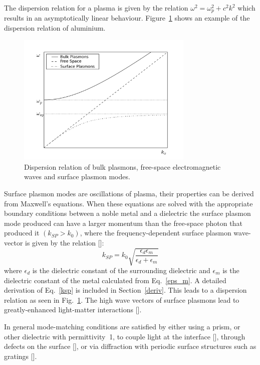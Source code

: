 The dispersion relation for a plasma is given by the relation $\omega^2 = \omega_p^2+c^2k^2$ which results in an asymptotically linear behaviour. Figure~\ref{dispRelation} shows an example of the dispersion relation of aluminium.
\begin{figure}[h!t]
\centering
\includegraphics[width=0.75\textwidth]{plasmon_dispersion.png}
\caption{Dispersion relation of bulk plasmons, free-space electromagnetic waves and surface plasmon modes.}
\label{dispRelation}
\end{figure}

Surface plasmon modes are oscillations of plasma, their properties can be derived from Maxwell's equations. When these equations are solved with the appropriate boundary conditions between a noble metal and a dielectric the surface plasmon mode produced can have a larger momentum than the free-space photon that produced it $(k_{SP}>k_0)$, where the frequency-dependent surface plasmon wave-vector is given by the relation [\cite{Sambles}]:
\begin{equation}
k_{SP} = k_0\sqrt{\frac{\epsilon_d\epsilon_m}{\epsilon_d+\epsilon_m}}
\label{ksp}
\end{equation}
where $\epsilon_d$ is the dielectric constant of the surrounding dielectric and $\epsilon_m$ is the dielectric constant of the metal calculated from Eq.~\ref{eps_m}. A detailed derivation of Eq.~\ref{ksp} is included in Section~\ref{deriv}. This leads to a dispersion relation as seen in Fig.~\ref{dispRelation}. The high wave vectors of surface plasmons lead to greatly-enhanced light-matter interactions [\cite{Todorov}].

In general mode-matching conditions are satisfied by either using a prism, or other dielectric with permittivity $\>$1, to couple light at the interface [\cite{Kretschmann}], through defects on the surface [\cite{Hecht}], or via diffraction with periodic surface structures such as gratings [\cite{Ritchie}].


